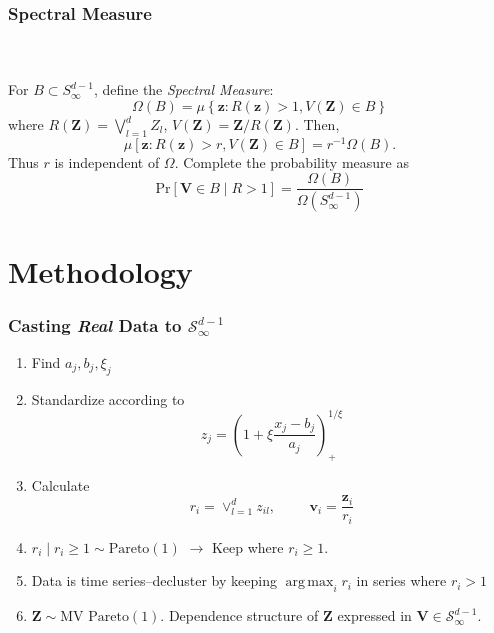 \documentclass[aspectratio=169]{beamer}
\DeclareMathOperator*{\argmax}{arg\,max}
\begin{document}
\begin{frame}
  \frametitle{Spectral Measure}
  {\scriptsize\cite{ferreira2014}}\\~\vspace{0.1cm}\\
  For $B \subset S_{\infty}^{d-1}$, define the \emph{Spectral Measure}:
  \begin{equation*}
    \Omega(B) = \mu\left\lbrace\bm{z}: R(\bm {z}) > 1, V(\bm{Z}) \in B\right\rbrace
  \end{equation*}
  where $R(\bm{Z}) = \bigvee_{l = 1}^d Z_l$, $V(\bm{Z}) = \bm{Z} / R(\bm{Z})$.  Then,
  \begin{equation*}
    \mu\left[\bm{z}:R(\bm{z})>r, V(\bm{Z})\in B\right] = r^{-1}\Omega(B).
  \end{equation*}
  Thus $r$ is independent of $\Omega$.  Complete the probability measure as
  \begin{equation*}
    \text{Pr}\left[\bm{V} \in B \mid R > 1\right] = \frac{\Omega(B)}{\Omega(S_{\infty}^{d-1})}
  \end{equation*}
\end{frame}

\section{Methodology}

\begin{frame}
  \frametitle{Casting \emph{Real} Data to $\mathcal{S}_{\infty}^{d-1}$}
  \begin{enumerate}
      \item Find $a_j, b_j, \xi_j$
      \item Standardize according to
        \begin{equation*}
         z_j = \left(1 + \xi\frac{x_j - b_{j}}{a_{j}}\right)_{+}^{1/\xi}
        \end{equation*}
      \item Calculate
        \begin{equation*}
            r_i = \vee_{l=1}^d z_{il},\hspace{1cm}\bm{v}_i = \frac{\bm{z}_i}{r_i}
        \end{equation*}
        
      \item $r_i\mid r_i \geq 1 \sim \text{Pareto}(1)$ $\rightarrow$ Keep where $r_i \geq 1$.
      \item Data is time series--decluster by keeping $\argmax_i r_i$ in series where $r_i > 1$
      \item $\bm{Z} \sim \text{MV Pareto}(1)$.  Dependence structure of $\bm{Z}$ expressed in $\bm{V}\in\mathcal{S}_{\infty}^{d-1}$.
  \end{enumerate}
\end{frame}
\end{document}
